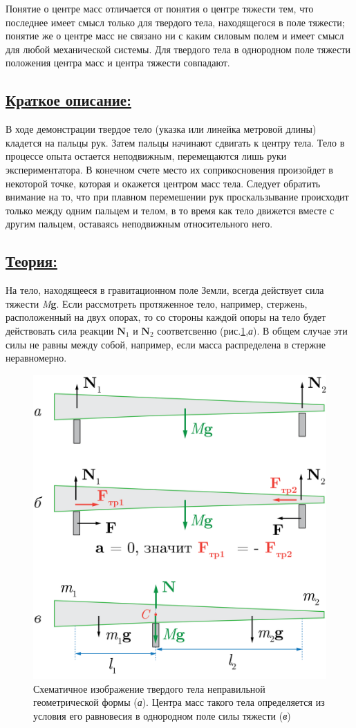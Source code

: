 \documentclass[14pt,a4paper,oneside]{extarticle}	%
\begin{document}
	Понятие о центре масс отличается от понятия о центре тяжести тем, 
	что последнее имеет смысл только для твердого тела, находящегося в поле тяжести;
	понятие же о центре масс не связано ни с каким силовым полем и имеет смысл для любой механической системы. 
	Для твердого тела в однородном поле тяжести положения центра масс и центра тяжести совпадают. 
	
\subsection*{\underline{Краткое описание:}}
	
В ходе демонстрации твердое тело (указка или линейка метровой длины) кладется на пальцы рук.
Затем пальцы начинают сдвигать к центру тела. Тело в процессе опыта остается неподвижным, перемещаются лишь руки экспериментатора.
В конечном счете место их соприкосновения произойдет в некоторой точке, которая и окажется центром масс тела.
Следует обратить внимание на то, что при плавном перемешении рук проскальзывание происходит только между одним пальцем и телом, в то время как тело движется вместе с другим пальцем, оставаясь неподвижным относительного него.

\subsection*{\underline{Теория:}}
		
		На тело, находящееся в гравитационном поле Земли, всегда действует сила тяжести \textit{M}\textbf{g}.
		Если рассмотреть протяженное тело, например, стержень, расположенный на двух опорах, то со стороны каждой опоры на тело будет действовать сила реакции $ \textbf{N}_1 $ и $ \textbf{N}_2 $ соответсвенно (рис.\ref{center-2},\textit{а}).
		В общем случае эти силы не равны между собой, например, если масса распределена в стержне неравномерно.
		\begin{figure}[H] 	
			\centering 	
			\includegraphics[width=0.6\linewidth]{center-2.png}
			\caption{Схематичное изображение твердого тела неправильной геометрической формы (\textit{а}). 
				Центра масс такого тела определяется из условия его равновесия в однородном поле силы тяжести (\textit{в})}
			\label{center-2}
		\end{figure}
	
\end{document}
